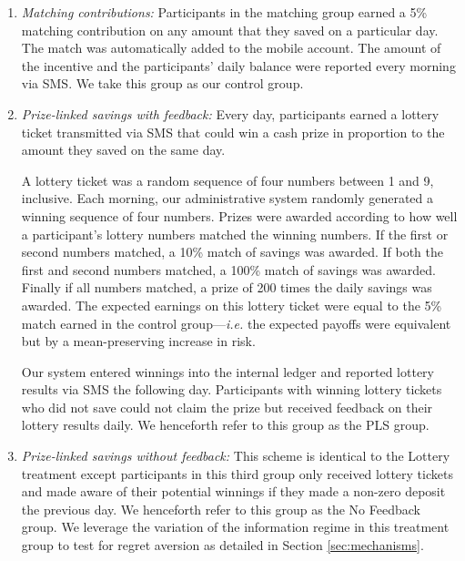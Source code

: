 \documentclass[11pt]{article}
\begin{document}
		\begin{enumerate} \setlength{\itemsep}{1pt}

			\item \textit{Matching contributions:} Participants in the matching group earned a 5\% matching contribution on any amount that they saved on a particular day. The match was automatically added to the mobile account. The amount of the incentive and the participants' daily balance were reported every morning via SMS. We take this group as our control group.

			\item \textit{Prize-linked savings with feedback:} Every day, participants earned a lottery ticket transmitted via SMS that could win a cash prize in proportion to the amount they saved on the same day.

			A lottery ticket was a random sequence of four numbers between 1 and 9, inclusive. Each morning, our administrative system randomly generated a winning sequence of four numbers. Prizes were awarded according to how well a participant's lottery numbers matched the winning numbers. If the first or second numbers matched, a 10\% match of savings was awarded. If both the first and second numbers matched, a 100\% match of savings was awarded. Finally if all numbers matched, a prize of 200 times the daily savings was awarded. The expected earnings on this lottery ticket were equal to the 5\% match earned in the control group---\textit{i.e.} the expected payoffs were equivalent but by a mean-preserving increase in risk.

			Our system entered winnings into the internal ledger and reported lottery results via SMS the following day. Participants with winning lottery tickets who did not save could not claim the prize but received feedback on their lottery results daily. We henceforth refer to this group as the PLS group. 

			\item \textit{Prize-linked savings without feedback:} This scheme is identical to the Lottery treatment except participants in this third group only received lottery tickets and made aware of their potential winnings if they made a non-zero deposit the previous day. We henceforth refer to this group as the No Feedback group. We leverage the variation of the information regime in this treatment group to test for regret aversion as detailed in Section \ref{sec:mechanisms}.

		\end{enumerate}
\end{document}
